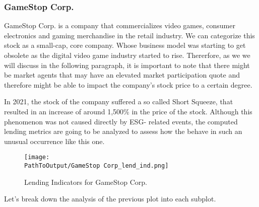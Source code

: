 \subsubsection{GameStop Corp.}

GameStop Corp. is a company that commercializes video games, consumer electronics and gaming merchandise in the retail industry. We can categorize this stock as a small-cap, core company. Whose business model was starting to get obsolete as the digital video game industry started to rise. Thererfore, as we we will discuss in the following paragraph, it is important to note that there might be market agents that may have an elevated market participation quote and therefore might be able to impact the company's stock price to a certain degree.

In 2021, the stock of the company suffered a so called Short Squeeze, that resulted in an increase of around 1,500\% in the price of the stock. Although this phenomenon was not caused directly by ESG- related events, the computed lending metrics are going to be analyzed to assess how the behave in such an unusual occurrence like this one.

\begin{figure}[H]
	\centering
	\caption{Lending Indicators for GameStop Corp.}
	  \centering
	  \texttt{[image: \\PathToOutput/GameStop Corp\_lend\_ind.png]}
	\label{fig:gamestop_lending_indicators}
\end{figure}

Let's break down the analysis of the previous plot into each subplot.

